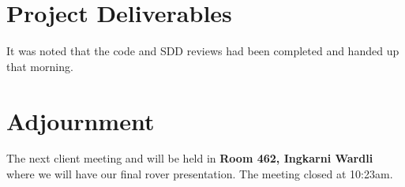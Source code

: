 \documentclass{article}
\begin{document}
\section{Project Deliverables}
	It was noted that the code and SDD reviews had been completed and handed up that morning.

\section{Adjournment}	
    The next client meeting and will be held in {\bf Room 462, Ingkarni Wardli} where we will have our final rover presentation.
The meeting closed at 10:23am.
\end{document}
